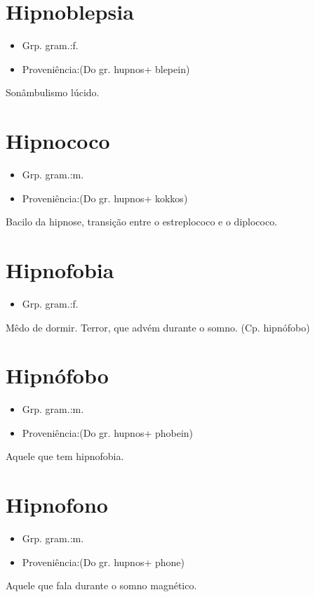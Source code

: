 \documentclass{article}
\begin{document}
\section{Hipnoblepsia}
\begin{itemize}
\item {Grp. gram.:f.}
\end{itemize}
\begin{itemize}
\item {Proveniência:(Do gr. \textunderscore hupnos\textunderscore  + \textunderscore blepein\textunderscore )}
\end{itemize}
Sonâmbulismo lúcido.
\section{Hipnococo}
\begin{itemize}
\item {Grp. gram.:m.}
\end{itemize}
\begin{itemize}
\item {Proveniência:(Do gr. \textunderscore hupnos\textunderscore  + \textunderscore kokkos\textunderscore )}
\end{itemize}
Bacilo da hipnose, transição entre o estreplococo e o diplococo.
\section{Hipnofobia}
\begin{itemize}
\item {Grp. gram.:f.}
\end{itemize}
Mêdo de dormir.
Terror, que advém durante o somno.
(Cp. \textunderscore hipnófobo\textunderscore )
\section{Hipnófobo}
\begin{itemize}
\item {Grp. gram.:m.}
\end{itemize}
\begin{itemize}
\item {Proveniência:(Do gr. \textunderscore hupnos\textunderscore  + \textunderscore phobein\textunderscore )}
\end{itemize}
Aquele que tem hipnofobia.
\section{Hipnofono}
\begin{itemize}
\item {Grp. gram.:m.}
\end{itemize}
\begin{itemize}
\item {Proveniência:(Do gr. \textunderscore hupnos\textunderscore  + \textunderscore phone\textunderscore )}
\end{itemize}
Aquele que fala durante o somno magnético.
\end{document}
